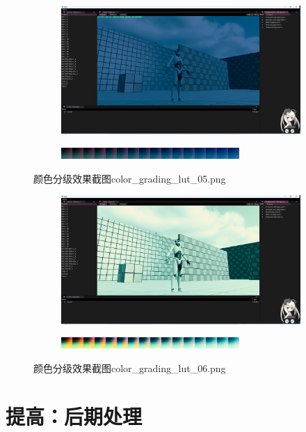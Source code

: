 \documentclass{ctexart}
\begin{document}
     \begin{figure}[htbp]
    	\centering
    	\begin{subfigure}{1.0\textwidth}
    		\includegraphics[width=\textwidth]{screen_shot_color_grading_map_color_grading_lut_05.png}
    	\end{subfigure}
    	\begin{subfigure}{1.0\textwidth}
    		\includegraphics[width=\textwidth]{color_grading_lut_05.png}
    	\end{subfigure}
    	\caption{颜色分级效果截图color\_grading\_lut\_05.png}
    \end{figure}    
    \begin{figure}[!htb]
    	\centering
    	\begin{subfigure}{1.0\textwidth}
    		\includegraphics[width=\textwidth]{screen_shot_color_grading_map_color_grading_lut_06.png}
    	\end{subfigure}
    	\begin{subfigure}{1.0\textwidth}
    		\includegraphics[width=\textwidth]{color_grading_lut_06.png}
    	\end{subfigure}  	
    	\caption{颜色分级效果截图color\_grading\_lut\_06.png}
    \end{figure}  
     
    \section{提高：后期处理}
     
     
\end{document}
